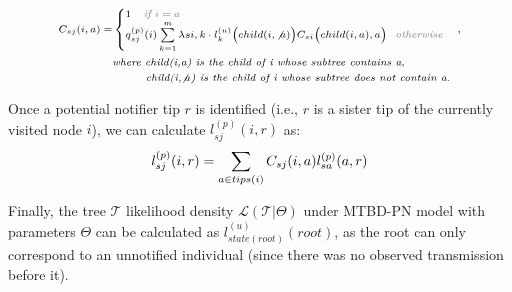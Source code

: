 \documentclass[a4paper,10pt]{article}
\begin{document}
\begin{equation}
\scriptsize
\begin{split}
C_{sj}(i,a) = &\begin{cases}
1 \textit{\color{gray}~~~if $i = a$}
\\
q^{(p)}_{sj}(i)
\sum\limits_{k=1}^{m}\lambda{si,k} \cdot l_{k}^{(u)}\Big(child(i, \not a)\Big)C_{si}\Big(child(i, a),a\Big) \textit{\color{gray}~~otherwise}\\ 
\end{cases},
\\ &\textit{where child(i,a) is the child of i whose subtree contains a},
\\
 &\textit{~~~~~~~~child(i,$\not a$) is the child of i whose subtree does not contain a.}
\end{split}
\label{eq:c}
\end{equation}


Once a potential notifier tip $r$ is identified (i.e., $r$ is a sister tip of the currently visited node $i$), we can calculate $l^{(p)}_{sj}(i, r)$ as:
\begin{equation}
\scriptsize 
l^{(p)}_{sj}(i, r) = \sum\limits_{a \in tips(i)}C_{sj}(i, a) l^{(p)}_{sa}(a, r)\label{eq:lp}
\end{equation}


Finally, the tree $\mathscr{T}$ likelihood density $\mathscr{L}(\mathscr{T}|\Theta)$ under MTBD-PN model with parameters $\Theta$ can be calculated as $l^{(u)}_{state(root)}(root)$, as the root can only correspond to an unnotified individual (since there was no observed transmission before it).

\end{document}
